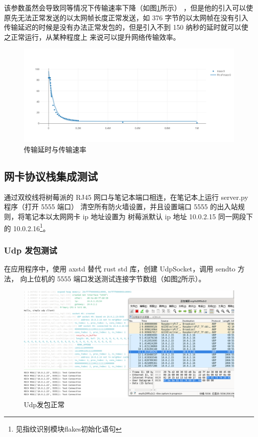     该参数虽然会导致同等情况下传输速率下降（如图\ref{test::传输延时与发送速率}所示）
    ，但是他的引入可以使原先无法正常发送的以太网帧长度正常发送，如 376 字节的以太网帧在没有引入
    传输延迟的时候是没有办法正常发包的，但是引入不到 150 纳秒的延时就可以使之正常运行，从某种程度上
    来说可以提升网络传输效率。

    \begin{figure}[ht]
        \centering
        \includegraphics[width=\textwidth]{./imgs/测试-传输延时与发送速率.png}
        \caption{传输延时与传输速率}    \label{test::传输延时与发送速率}
    \end{figure}   

    \subsection{网卡协议栈集成测试}

    通过双绞线将树莓派的 RJ45 网口与笔记本端口相连，在笔记本上运行 server.py 程序（打开 5555 端口）
    清空所有防火墙设置，并且设置端口 5555 的出入站规则，将笔记本以太网网卡 ip 地址设置为
    树莓派默认 ip 地址 10.0.2.15 同一网段下的 10.0.2.16\footnote{见指纹识别模块flakes初始化语句}。

    \subsubsection{Udp 发包测试}

    在应用程序中，使用 axstd 替代 rust std 库，创建 UdpSocket，调用 sendto 方法，
    向上位机的 5555 端口发送测试连接字节数组（如图\ref{test::Udp发包}所示）。

    \begin{figure}[ht]
        \centering
        \includegraphics[width=\textwidth]{./imgs/测试-udp发包正常.png}
        \caption{Udp发包正常}    \label{test::Udp发包}
    \end{figure}   

